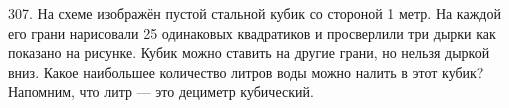 307. На схеме изображён пустой стальной кубик со стороной 1 метр. На каждой его грани нарисовали 25 одинаковых квадратиков и просверлили три дырки как показано на рисунке. Кубик можно ставить на другие грани, но нельзя дыркой вниз. Какое наибольшее количество литров воды можно налить в этот кубик? Напомним, что литр --- это дециметр кубический.
\begin{figure}[ht!]
\end{figure}\\
